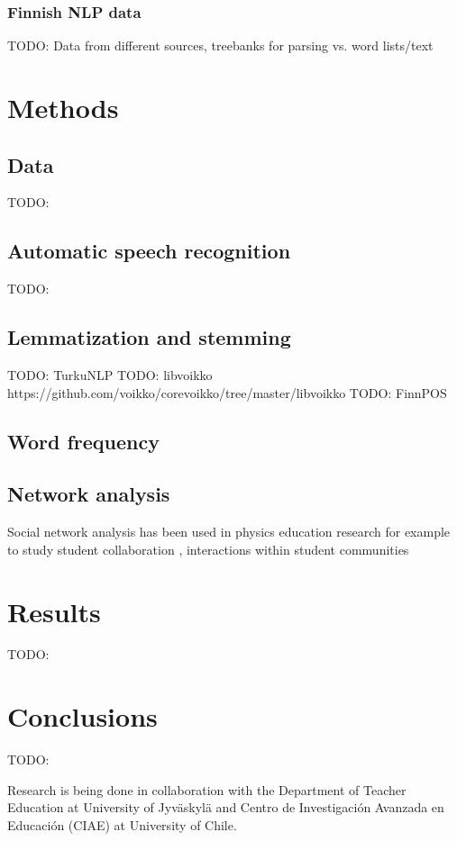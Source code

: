 \documentclass[utf8,english]{gradu3}
\begin{document}
\subsection{Finnish NLP data}
TODO: Data from different sources, treebanks for parsing vs. word lists/text

\chapter{Methods}

\section{Data}
  TODO: \parencite{fischer2014quality}
\section{Automatic speech recognition}
  TODO: \parencite{enarvi2018modeling}
\section{Lemmatization and stemming}
  TODO: TurkuNLP \parencite{kanerva2018turku}
  TODO: libvoikko https://github.com/voikko/corevoikko/tree/master/libvoikko
  TODO: FinnPOS \parencite{silfverberg2016finnpos}
\section{Word frequency}
\section{Network analysis}
Social network analysis has been used in physics education research for example to study student collaboration \parencite{vargas2018correlation}, interactions within student communities \parencite{brewe2012investigating} 

\chapter{Results}

TODO:
\chapter{Conclusions}
TODO:

Research is being done in collaboration with the Department of Teacher Education at University of Jyväskylä and Centro de Investigación Avanzada en Educación (CIAE) at University of Chile.
 
\printbibliography
\end{document}
